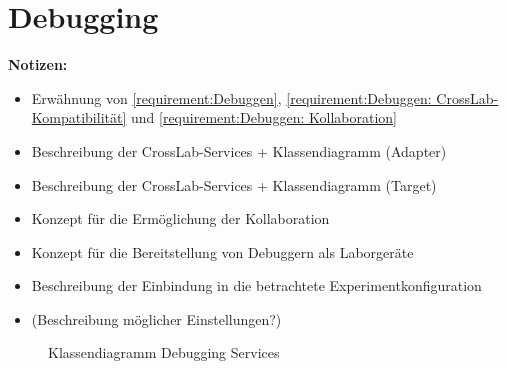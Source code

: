 \section{Debugging}\label{section:konzeption:debugging}

\begin{note}
    \textbf{Notizen:}
    \begin{itemize}
        \item Erwähnung von \autoref{requirement:Debuggen}, \autoref{requirement:Debuggen: CrossLab-Kompatibilität} und \autoref{requirement:Debuggen: Kollaboration}
        \item Beschreibung der CrossLab-Services + Klassendiagramm (Adapter)
        \item Beschreibung der CrossLab-Services + Klassendiagramm (Target)
        \item Konzept für die Ermöglichung der Kollaboration
        \item Konzept für die Bereitstellung von Debuggern als Laborgeräte
        \item Beschreibung der Einbindung in die betrachtete Experimentkonfiguration
        \item (Beschreibung möglicher Einstellungen?)
    \end{itemize}
\end{note}

\begin{figure}[tbp]
    \centering
    \caption{Klassendiagramm Debugging Services}
    \label{figure:klassendiagramm-debugging-services}
\end{figure}

